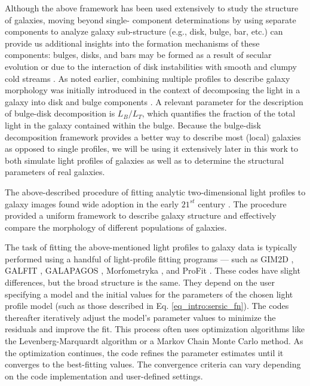 Although the above framework has been used extensively to study the structure of galaxies, moving beyond single-\sersic{} component determinations by using separate components to analyze galaxy sub-structure (e.g., disk, bulge, bar, etc.) can provide us additional insights into the formation mechanisms of these components: bulges, disks, and bars may be formed as a result of secular evolution \citep[e.g.,][]{kormendy_2004, genzel_2008, sellwood_2014} or due to the interaction of disk instabilities with smooth and clumpy cold streams \citep[e.g.,][]{dekel_09a,dekel_09b}. As noted earlier, combining multiple \sersic{} profiles to describe galaxy morphology was initially introduced in the context of decomposing the light in a galaxy into disk and bulge components \citep{kormendy_1979}. A relevant parameter for the description of bulge-disk decomposition is $L_B/L_T$, which quantifies the fraction of the total light in the galaxy contained within the bulge. Because the bulge-disk decomposition framework provides a better way to describe most (local) galaxies as opposed to single \sersic{} profiles, we will be using it extensively later in this work to both simulate light profiles of galaxies as well as to determine the structural parameters of real galaxies.

The above-described procedure of fitting analytic two-dimensional light profiles to galaxy images found wide adoption in the early $21^{st}$ century \citep[e.g.,][]{graham_03, kormendy_09, simard_11,vdw_12}. The procedure provided a uniform framework to describe galaxy structure and effectively compare the morphology of different populations of galaxies. 

The task of fitting the above-mentioned light profiles to galaxy data is typically performed using a handful of light-profile fitting programs --- such as GIM2D \citep{gim2d}, GALFIT \citep{galfit}, GALAPAGOS \citep{galapagos}, Morfometryka \citep{morfometryka}, and ProFit \citep{profit}. These codes have slight differences, but the broad structure is the same. They depend on the user specifying a model and the initial values for the parameters of the chosen light profile model (such as those described in Eq. \ref{eq_intro:sersic_fn}). The codes thereafter iteratively adjust the  model's parameter values to minimize the residuals and improve the fit. This process often uses optimization algorithms like the Levenberg-Marquardt algorithm or a Markov Chain Monte Carlo method. As the optimization continues, the code refines the parameter estimates until it converges to the best-fitting values. The convergence criteria can vary depending on the code implementation and user-defined settings.

